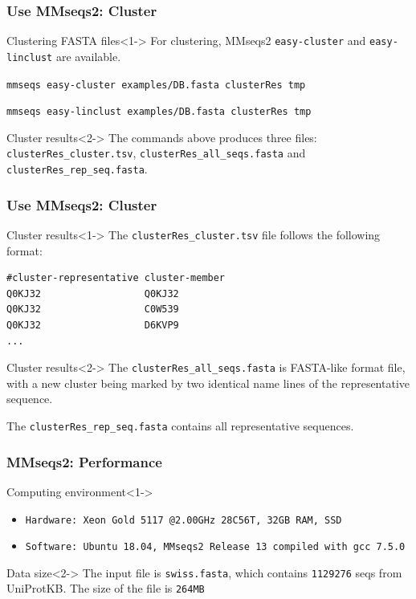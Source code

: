 \documentclass[UTF8]{beamer}
\begin{document}
	\begin{frame}[fragile]
	    \frametitle{Use MMseqs2: Cluster}
		\begin{block}{Clustering FASTA files}<1->
			For clustering, MMseqs2 \lstinline{easy-cluster} and \lstinline{easy-linclust} are available.

			\lstinline{mmseqs easy-cluster examples/DB.fasta clusterRes tmp}

			\lstinline{mmseqs easy-linclust examples/DB.fasta clusterRes tmp}
		\end{block}

		\begin{block}{Cluster results}<2->
			The commands above produces three files: \lstinline{clusterRes_cluster.tsv}, 
			\lstinline{clusterRes_all_seqs.fasta} and \lstinline{clusterRes_rep_seq.fasta}.
		\end{block}

    \end{frame}

	\begin{frame}[fragile]
	    \frametitle{Use MMseqs2: Cluster}
		\begin{block}{Cluster results}<1->
			The \lstinline{clusterRes_cluster.tsv} file follows the following format:

			\begin{lstlisting}[frame=single]
#cluster-representative cluster-member
Q0KJ32                  Q0KJ32
Q0KJ32                  C0W539
Q0KJ32                  D6KVP9
...
\end{lstlisting}
		\end{block}

		\begin{block}{Cluster results}<2->
			The \lstinline{clusterRes_all_seqs.fasta} is FASTA-like format file, 
			with a new cluster being marked by two identical name lines of the representative sequence.

			The \lstinline{clusterRes_rep_seq.fasta} contains all representative sequences.
		\end{block}

    \end{frame}

	\begin{frame}[fragile]
	    \frametitle{MMseqs2: Performance}

		\begin{block}{Computing environment}<1->
			\begin{itemize}
				\item \lstinline{Hardware: Xeon Gold 5117 @2.00GHz 28C56T, 32GB RAM, SSD}
				\item \lstinline{Software: Ubuntu 18.04, MMseqs2 Release 13 compiled with gcc 7.5.0}
			\end{itemize}
		\end{block}

		\begin{block}{Data size}<2->
			The input file is \lstinline{swiss.fasta}, which contains \alert{\lstinline{1129276}} seqs from UniProtKB.
			The size of the file is \alert{\lstinline{264MB}}
		\end{block}
    \end{frame}
\end{document}
